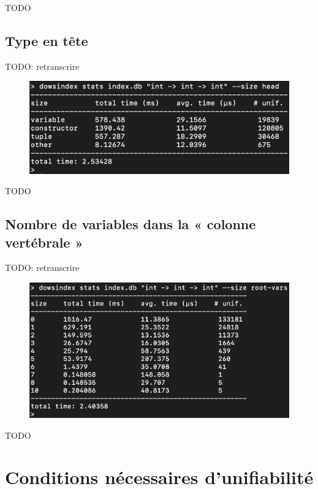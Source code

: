 \documentclass [a4paper] {report}
\theoremstyle {definition}
\begin{document}
TODO

\subsection {Type en tête}

TODO: retranscrire
\begin {figure} [h]
\begin {center}
	\includegraphics [scale=0.2] {images/stats2}
\end {center}
\end {figure}

TODO

\subsection {Nombre de variables dans la « colonne vertébrale »}

TODO: retranscrire
\begin {figure} [h]
\begin {center}
	\includegraphics [scale=0.2] {images/stats3}
\end {center}
\end {figure}

TODO

\section {Conditions nécessaires d'unifiabilité}
\end{document}
